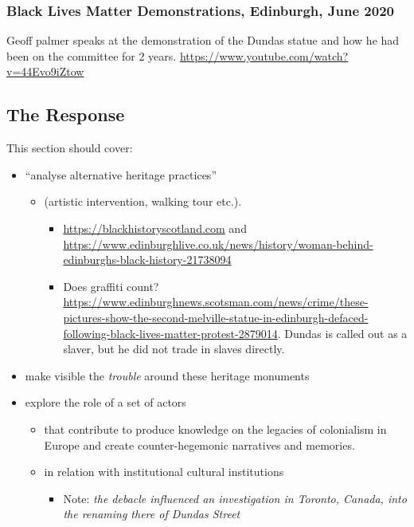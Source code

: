\documentclass{scrartcl}
\begin{document}
\subsubsection{Black Lives Matter Demonstrations, Edinburgh, June 2020}

Geoff palmer speaks at the demonstration of the Dundas statue and how he had been on the committee for 2 years. \url{https://www.youtube.com/watch?v=44Evo9iZtow}

\subsection{The Response}

This section should cover:

\begin{itemize}
    \item ``analyse alternative heritage practices''
    \begin{itemize}
        \item  (artistic intervention, walking tour etc.).
        \begin{itemize}
            \item \url{https://blackhistoryscotland.com} and \url{https://www.edinburghlive.co.uk/news/history/woman-behind-edinburghs-black-history-21738094}
        \end{itemize}
        \begin{itemize}
            \item Does graffiti count? \url{https://www.edinburghnews.scotsman.com/news/crime/these-pictures-show-the-second-melville-statue-in-edinburgh-defaced-following-black-lives-matter-protest-2879014}. Dundas is called out as a slaver, but he did not trade in slaves directly.
        \end{itemize}
    \end{itemize}
    \item make visible the \textit{trouble} around these heritage monuments
    \item explore the role of a set of actors
    \begin{itemize}
        \item that contribute to produce knowledge on the legacies of colonialism in Europe and create counter-hegemonic narratives and memories.
        \item in relation with institutional cultural institutions
        \begin{itemize}
            \item Note: \textit{the debacle influenced an investigation in Toronto, Canada, into the renaming there of Dundas Street} \cite{mccarthy_2022}
        \end{itemize}
    \end{itemize}
\end{itemize}
\end{document}
